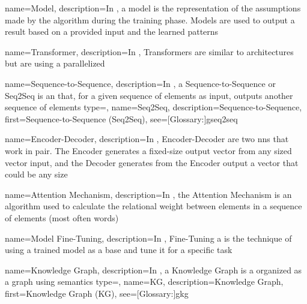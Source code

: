 
{
  name={Model},
  description={In , a model is the representation of the assumptions made by the algorithm during the training phase. Models are used to output a result based on a provided input and the learned patterns}
}

{
  name={Transformer},
  description={In , Transformers are similar to  architectures but are using a parallelized }
}

{
  name={Sequence-to-Sequence},
  description={In , a Sequence-to-Sequence or Seq2Seq is an   that, for a given sequence of elements as input, outputs another sequence of elements}
}
{
  type=\acronymtype,
  name={Seq2Seq},
  description={Sequence-to-Sequence},
  first={Sequence-to-Sequence (Seq2Seq)},
  see=[Glossary:]{gseq2seq}
}

{
  name={Encoder-Decoder},
  description={In , Encoder-Decoder are two \glspl{nn} that work in pair. The Encoder generates a fixed-size output vector from any sized vector input, and the Decoder generates from the Encoder output a vector that could be any size}
}

{
  name={Attention Mechanism},
  description={In , the Attention Mechanism is an algorithm used to calculate the relational weight between elements in a sequence of elements (most often words)}
}

{
  name={Model Fine-Tuning},
  description={In , Fine-Tuning a  is the technique of using a trained  model as a base and tune it for a specific task}
}

{
  name={Knowledge Graph},
  description={In , a Knowledge Graph is a  organized as a graph using semantics}
}
{
  type=\acronymtype,
  name={KG},
  description={Knowledge Graph},
  first={Knowledge Graph (KG)},
  see=[Glossary:]{gkg}
}

